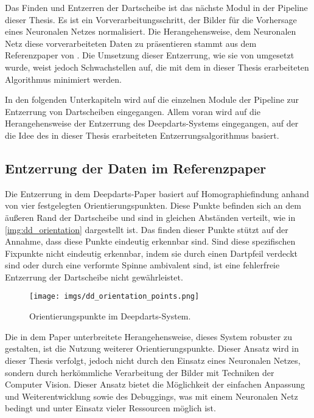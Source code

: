 Das Finden und Entzerren der Dartscheibe ist das nächste Modul in der Pipeline dieser Thesis. Es ist ein Vorverarbeitungsschritt, der Bilder für die Vorhersage eines Neuronalen Netzes normalisiert. Die Herangehensweise, dem Neuronalen Netz diese vorverarbeiteten Daten zu präsentieren stammt aus dem Referenzpaper von \citeauthor{deepdarts} \cite{deepdarts}. Die Umsetzung dieser Entzerrung, wie sie von \citeauthor{deepdarts} umgesetzt wurde, weist jedoch Schwachstellen auf, die mit dem in dieser Thesis erarbeiteten Algorithmus minimiert werden.

In den folgenden Unterkapiteln wird auf die einzelnen Module der Pipeline zur Entzerrung von Dartscheiben eingegangen. Allem voran wird auf die Herangehensweise der Entzerrung des Deepdarts-Systems eingegangen, auf der die Idee des in dieser Thesis erarbeiteten Entzerrungsalgorithmus basiert.

\subsection{Entzerrung der Daten im Referenzpaper}
\label{sec:impl:cv:paper}

Die Entzerrung in dem Deepdarts-Paper basiert auf Homographiefindung anhand von vier festgelegten Orientierungspunkten. Diese Punkte befinden sich an dem äußeren Rand der Dartscheibe und sind in gleichen Abständen verteilt, wie in \autoref{img:dd_orientation} dargestellt ist. Das finden dieser Punkte stützt auf der Annahme, dass diese Punkte eindeutig erkennbar sind. Sind diese spezifischen Fixpunkte nicht eindeutig erkennbar, indem sie durch einen Dartpfeil verdeckt sind oder durch eine verformte Spinne ambivalent sind, ist eine fehlerfreie Entzerrung der Dartscheibe nicht gewährleistet.

\begin{figure}
    \centering
    \texttt{[image: imgs/dd\_orientation\_points.png]}
    \caption{Orientierungspunkte im Deepdarts-System. \cite{deepdarts}}
    \label{img:dd_orientation}
\end{figure}

Die in dem Paper unterbreitete Herangehensweise, dieses System robuster zu gestalten, ist die Nutzung weiterer Orientierungspunkte. Dieser Ansatz wird in dieser Thesis verfolgt, jedoch nicht durch den Einsatz eines Neuronalen Netzes, sondern durch herkömmliche Verarbeitung der Bilder mit Techniken der Computer Vision. Dieser Ansatz bietet die Möglichkeit der einfachen Anpassung und Weiterentwicklung sowie des Debuggings, was mit einem Neuronalen Netz bedingt und unter Einsatz vieler Ressourcen möglich ist.


